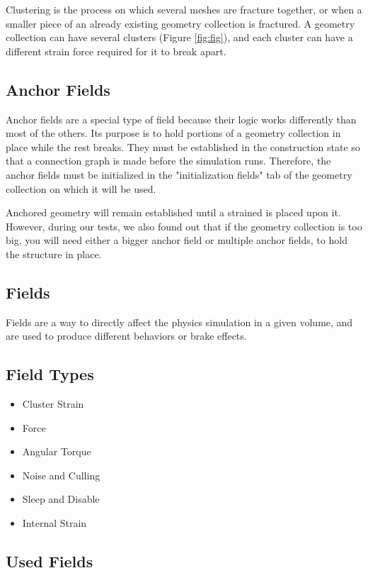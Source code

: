 \documentclass[sigconf]{acmart}
\begin{document}
Clustering is the process on which several meshes are fracture together, or when a smaller piece of an already existing geometry collection is fractured. A geometry collection can have several clusters (Figure \ref{fig:fig}), and each cluster can have a different strain force required for it to break apart. 

\subsection{Anchor Fields}

Anchor fields are a special type of field because their logic works differently than most of the others. Its purpose is to hold portions of a geometry collection in place while the rest breaks. They must be established in the construction state so that a connection graph is made before the simulation runs. Therefore, the anchor fields must be initialized in the "initialization fields" tab of the geometry collection on which it will be used.

Anchored geometry will remain established until a strained is placed upon it. However, during our tests, we also found out that if the geometry collection is too big, you will need either a bigger anchor field or multiple anchor fields, to hold the structure in place.

\subsection{Fields}

Fields are a way to directly affect the physics simulation in a given volume, and are used to produce different behaviors or brake effects.

\subsection{Field Types}

\begin{itemize}
    \item Cluster Strain
    \item Force
    \item Angular Torque
    \item Noise and Culling
    \item Sleep and Disable
    \item Internal Strain
\end{itemize}

\subsection{Used Fields}
\end{document}
